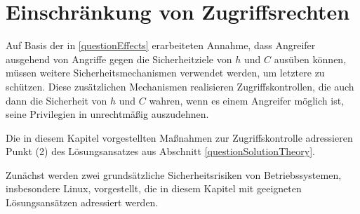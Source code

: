 \documentclass[../main.tex]{subfiles}
\begin{document}






  \section{Einschränkung von Zugriffsrechten}
		\label{secAccessControls}

		Auf Basis der in \ref{questionEffects} erarbeiteten Annahme, dass Angreifer ausgehend von \cbroken{} Angriffe gegen die Sicherheitziele von \(h\) und \(C\) ausüben können, müssen weitere Sicherheitsmechanismen verwendet werden, um letztere zu schützen. Diese zusätzlichen Mechanismen realisieren Zugriffskontrollen, die auch dann die Sicherheit von \(h\) und \(C\) wahren, wenn es einem Angreifer möglich ist, seine Privilegien in \cbroken{} unrechtmäßig auszudehnen.

		Die in diesem Kapitel vorgestellten Maßnahmen zur Zugriffskontrolle adressieren Punkt (2) des Lösungsansatzes aus Abschnitt \ref{questionSolutionTheory}.

		Zunächst werden zwei grundsätzliche Sicherheitsrisiken von Betriebssystemen, insbesondere Linux, vorgestellt, die in diesem Kapitel mit geeigneten Lösungsansätzen adressiert werden.
\end{document}

